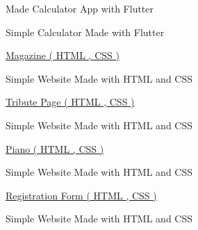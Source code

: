 

\begin{cventries}
      \cventry
    {} %
    {Made Calculator App with Flutter} %
    {} %
    {} %
    {
      \begin{cvitems} %
      \item {Simple Calculator Made with Flutter}
    \end{cvitems}
      }
  \cventry
    {} %
    {\href{https://shafeenyousafzaii.github.io/Magazine---CSS-GRID-BOX-/}{Magazine ( HTML , CSS )}   \textnormal{ \textit{}}} %
    {} %
    {} %
    {
      \begin{cvitems} %
      \item {Simple Website Made with HTML and CSS}
    \end{cvitems}
      }

        \cventry
    {} %
    {\href{https://shafeenyousafzaii.github.io/Tribute-Page-Certification-Project/}{Tribute Page ( HTML , CSS )} \textnormal{ \textit{}}} %
    {} %
    {} %
    {   \begin{cvitems} %
      \item {Simple Website Made with HTML and CSS}
    \end{cvitems}
      }


        \cventry
    {} %
    {\href{https://shafeenyousafzaii.github.io/Piano/}{Piano ( HTML , CSS )}  \textnormal{ \textit{}}} %
    {} %
    {} %
    {   \begin{cvitems} %
      \item {Simple Website Made with HTML and CSS}
    \end{cvitems}
      }


        \cventry
    {} %
    {\href{https://shafeenyousafzaii.github.io/HTML-forms-registration-form/}{Registration Form ( HTML , CSS )}  \textnormal{ \textit{}}} %
    {} %
    {} %
    {   \begin{cvitems} %
      \item {Simple Website Made with HTML and CSS}
    \end{cvitems}
      }



\end{cventries}
